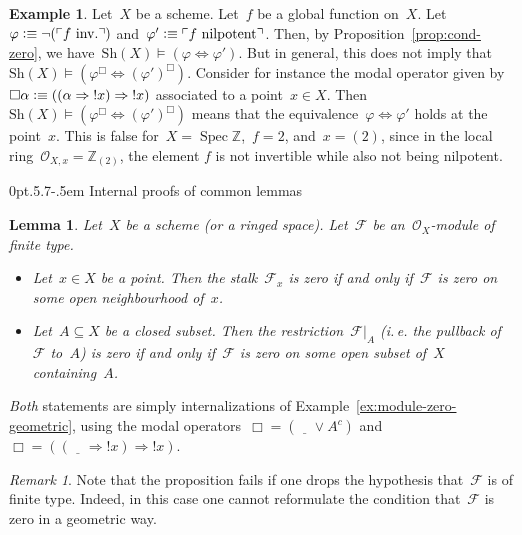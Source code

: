 \documentclass[10pt,reqno,a4paper]{amsbook}
\makeatletter
\theoremstyle{definition}
\newtheorem{ex}[defn]{Example}
\theoremstyle{plain}
\newtheorem{lemma}[defn]{Lemma}
\theoremstyle{remark}
\newtheorem{rem}[defn]{Remark}
\newcommand{\ZZ}{\mathbb{Z}}
\newcommand{\F}{\mathcal{F}}
\renewcommand{\O}{\mathcal{O}}
\newcommand{\placeholder}{\underline{\quad}}
\newcommand{\Sh}{\mathrm{Sh}}
\DeclareMathOperator{\Spec}{Spec}
\newcommand{\?}{\,{:}\,}
\renewcommand{\_}{\mathpunct{.}\,}
\newcommand{\speak}[1]{\ulcorner\text{\textnormal{#1}}\urcorner}
\newcommand{\notat}[1]{{!#1}}
\newcommand{\ie}{i.\,e.\@\xspace}
\newcommand{\inv}{inv.\@}
\newcommand{\defequiv}{\vcentcolon\equiv}
\renewenvironment{proof}[1][\proofname]{\par
  \pushQED{\qed}%
  \normalfont \topsep6\p@\@plus6\p@\relax
  \trivlist
  \item[\hskip\labelsep
        \itshape
    #1\@addpunct{.}]\ignorespaces
}{%
  \popQED\endtrivlist\@endpefalse
}
\def\subsection{\@startsection{subsection}{2}%
  {0pt}{.5\linespacing\@plus.7\linespacing}{-.5em}%
  {\normalfont\bfseries}}
\makeatother
\begin{document}
\begin{ex}\label{ex:translation-equivalence}Let~$X$ be a scheme. Let~$f$ be a
global function on~$X$. Let~$\varphi \defequiv \neg(\speak{$f$ \inv})$
and~$\varphi' \defequiv \speak{$f$ nilpotent}$. Then, by Proposition~\ref{prop:cond-zero}, we
have~$\Sh(X) \models (\varphi \Leftrightarrow \varphi')$. But in general, this
does not imply that~$\Sh(X) \models (\varphi^\Box \Leftrightarrow
(\varphi')^\Box)$. Consider for instance the modal operator given by~$\Box\alpha
\defequiv ((\alpha \Rightarrow \notat{x}) \Rightarrow \notat{x})$ associated to a
point~$x \in X$. Then~$\Sh(X) \models (\varphi^\Box \Leftrightarrow
(\varphi')^\Box)$ means that the equivalence~$\varphi \Leftrightarrow \varphi'$
holds at the point~$x$. This is false for~$X = \Spec \ZZ$,~$f = 2$, and~$x =
(2)$, since in the local ring~$\O_{X,x} = \ZZ_{(2)}$, the element $f$ is not invertible
while also not being nilpotent.
\end{ex}


\subsection{Internal proofs of common lemmas}

\begin{lemma}\label{lemma:module-zero-point-neighbourhood}
Let~$X$ be a scheme (or a ringed space). Let~$\F$ be an~$\O_X$-module
of finite type.
\begin{itemize}
\item Let~$x \in X$ be a point. Then the stalk~$\F_x$ is zero if and
only if~$\F$ is zero on some open neighbourhood of~$x$.
\item Let~$A \subseteq X$ be a closed subset. Then the restriction~$\F|_A$ (\ie
the pullback of~$\F$ to~$A$) is zero if and only if~$\F$ is zero on some open
subset of~$X$ containing~$A$.
\end{itemize}
\end{lemma}
\begin{proof}\emph{Both} statements are simply internalizations of
Example~\ref{ex:module-zero-geometric}, using the modal operators~$\Box =
(\placeholder \vee A^c)$ and~$\Box = ((\placeholder \Rightarrow
\notat{x}) \Rightarrow \notat{x})$.
\end{proof}

\begin{rem}Note that the proposition fails if one drops the hypothesis
that~$\F$ is of finite type. Indeed, in this case one cannot reformulate the
condition that~$\F$ is zero in a geometric way.\end{rem}
\end{document}
